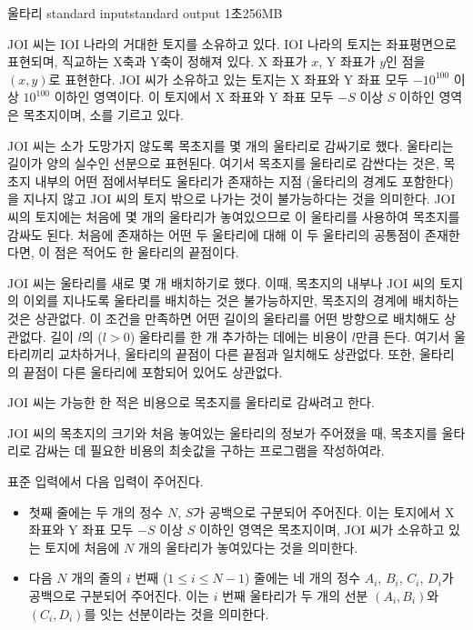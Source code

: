 \begin{problem}{울타리}
	{standard input}{standard output}
	{1초}{256MB}{}
	
	JOI 씨는 IOI 나라의 거대한 토지를 소유하고 있다. IOI 나라의 토지는 좌표평면으로 표현되며, 직교하는 X축과 Y축이 정해져 있다. X 좌표가 $x$, Y 좌표가 $y$인 점을 $(x, y)$로 표현한다. JOI 씨가 소유하고 있는 토지는 X 좌표와 Y 좌표 모두 $-10^{100}$ 이상 $10^{100}$ 이하인 영역이다. 이 토지에서 X 좌표와 Y 좌표 모두 $-S$ 이상 $S$ 이하인 영역은 목초지이며, 소를 기르고 있다.
	
	JOI 씨는 소가 도망가지 않도록 목초지를 몇 개의 울타리로 감싸기로 했다. 울타리는 길이가 양의 실수인 선분으로 표현된다. 여기서 목초지를 울타리로 감싼다는 것은, 목초지 내부의 어떤 점에서부터도 울타리가 존재하는 지점 (울타리의 경계도 포함한다) 을 지나지 않고 JOI 씨의 토지 밖으로 나가는 것이 불가능하다는 것을 의미한다. JOI 씨의 토지에는 처음에 몇 개의 울타리가 놓여있으므로 이 울타리를 사용하여 목초지를 감싸도 된다. 처음에 존재하는 어떤 두 울타리에 대해 이 두 울타리의 공통점이 존재한다면, 이 점은 적어도 한 울타리의 끝점이다.
	
	JOI 씨는 울타리를 새로 몇 개 배치하기로 했다. 이때, 목초지의 내부나 JOI 씨의 토지의 이외를 지나도록 울타리를 배치하는 것은 불가능하지만, 목초지의 경계에 배치하는 것은 상관없다. 이 조건을 만족하면 어떤 길이의 울타리를 어떤 방향으로 배치해도 상관없다. 길이 $l$의 ($l > 0$) 울타리를 한 개 추가하는 데에는 비용이 $l$만큼 든다. 여기서 울타리끼리 교차하거나, 울타리의 끝점이 다른 끝점과 일치해도 상관없다. 또한, 울타리의 끝점이 다른 울타리에 포함되어 있어도 상관없다.
	
	JOI 씨는 가능한 한 적은 비용으로 목초지를 울타리로 감싸려고 한다.
	
	JOI 씨의 목초지의 크기와 처음 놓여있는 울타리의 정보가 주어졌을 때, 목초지를 울타리로 감싸는 데 필요한 비용의 최솟값을 구하는 프로그램을 작성하여라.
	
	
	\InputFile
	
	표준 입력에서 다음 입력이 주어진다.
	
	\begin{itemize}
		\item 첫째 줄에는 두 개의 정수 $N$, $S$가 공백으로 구분되어 주어진다. 이는 토지에서 X 좌표와 Y 좌표 모두 $-S$ 이상 $S$ 이하인 영역은 목초지이며, JOI 씨가 소유하고 있는 토지에 처음에 $N$ 개의 울타리가 놓여있다는 것을 의미한다.
		\item 다음 $N$ 개의 줄의 $i$ 번째 ($1 \le i \le N-1$) 줄에는 네 개의 정수 $A_i$, $B_i$, $C_i$, $D_i$가 공백으로 구분되어 주어진다. 이는 $i$ 번째 울타리가 두 개의 선분 $(A_i, B_i)$와 $(C_i, D_i)$를 잇는 선분이라는 것을 의미한다.
	\end{itemize}
		

\end{problem}
